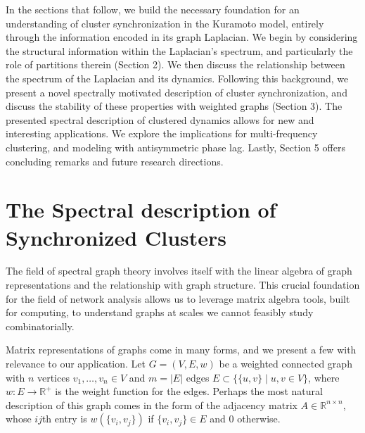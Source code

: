 \documentclass[%
 aip,
 amsmath,amssymb,
preprint,
reprint, onecolumn %
]{revtex4-1}
\newcommand{\R}{\mathbb{R}}
\begin{document}
In the sections that follow, we build the necessary foundation for an understanding of cluster synchronization in the Kuramoto model, entirely through the information encoded in its graph Laplacian. We begin by considering the structural information within the Laplacian's spectrum, and particularly the role of partitions therein (Section 2). We then discuss the relationship between the spectrum of the Laplacian and its dynamics. Following this background, we present a novel spectrally motivated description of cluster synchronization, and discuss the stability of these properties with weighted graphs (Section 3). The presented spectral description of clustered dynamics allows for new and interesting applications. We explore the implications for multi-frequency clustering, and modeling with antisymmetric phase lag. Lastly, Section 5 offers concluding remarks and future research directions.



\section{The Spectral description of Synchronized Clusters}
\label{sec:spectral_description_of_synchronized_clusters}



The field of spectral graph theory involves itself with the linear algebra of graph representations and the relationship with graph structure. This crucial foundation for the field of network analysis allows us to leverage matrix algebra tools, built for computing, to understand graphs at scales we cannot feasibly study combinatorially. 


Matrix representations of graphs come in many forms, and we present a few with relevance to our application. Let $G=(V,E,w)$ be a weighted connected graph with $n$ vertices $v_1, \dots, v_n\in V$ and $m=|E|$ edges $E \subset \{ \{u,v\} \mid u,v \in V \}$, where $w:E\to \R^+$ is the weight function for the edges. Perhaps the most natural description of this graph comes in the form of the adjacency matrix $A\in \R^{n\times n}$, whose $ij$th entry is $w(\{v_i,v_j\})$ if $\{v_i,v_j\}\in E$ and $0$ otherwise. 
\end{document}
